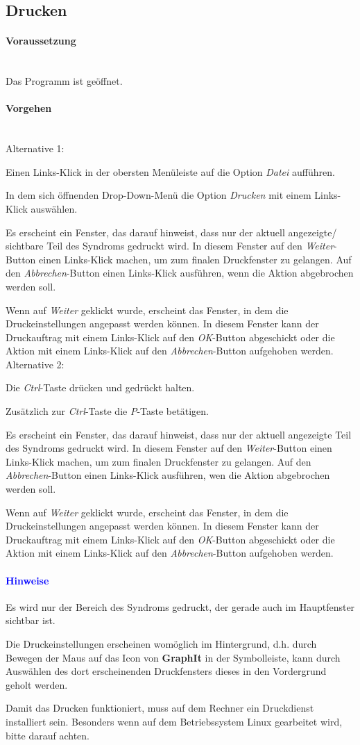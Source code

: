 \documentclass[enabledeprecatedfontcommands,fontsize=11pt,paper=a4,twoside]{scrartcl}
\newcounter{one}
\newcounter{two}[one]
\newcommand*{\hint}{\paragraph{\textcolor{blue}{Hinweise}}}
\newcommand*{\condition}{\paragraph{Voraussetzung}$\;$ \vspace{0.2cm}\\}
\newcommand*{\actions}{\paragraph{Vorgehen} $\;$\vspace{0.2cm}\\}
\newcommand*{\aOne}{\textcolor{bbe}{Alternative 1:}}
\newcommand*{\aTwo}{\textcolor{bbe}{Alternative 2:}}
\let\tempone\itemize
\let\temptwo\enditemize
\renewenvironment{itemize}{\tempone\addtolength{\itemsep}{-10.0pt}}{\temptwo}
\let\origenumerate\enumerate
\let\origendenumerate\endenumerate
\renewenvironment{enumerate}{\origenumerate \addtolength{\itemsep}{-10.0pt}}{\origendenumerate}
\begin{document}
\subsection{Drucken} \label{print}
	\condition 
	Das Programm ist geöffnet.
	\actions
	\aOne
	\begin{enumerate}
		\item Einen Links-Klick in der obersten Menüleiste auf die Option \textit{Datei} aufführen.
		\item In dem sich öffnenden Drop-Down-Menü die Option \textit{Drucken} mit einem Links-Klick auswählen.
		\item Es erscheint ein Fenster, das darauf hinweist, dass nur der aktuell angezeigte/ sichtbare Teil des Syndroms gedruckt wird. In diesem Fenster auf den \textit{Weiter}-Button einen Links-Klick machen, um zum finalen Druckfenster zu gelangen. Auf den \textit{Abbrechen}-Button einen Links-Klick ausführen, wenn die Aktion abgebrochen werden soll.
		\item Wenn auf \textit{Weiter} geklickt wurde, erscheint das Fenster, in dem die Druckeinstellungen angepasst werden können. In diesem Fenster kann der Druckauftrag mit einem Links-Klick auf den \textit{OK}-Button abgeschickt oder die Aktion mit einem Links-Klick auf den \textit{Abbrechen}-Button aufgehoben werden.
	\end{enumerate} 
	\aTwo
	\begin{enumerate}
		\item Die \textit{Ctrl}-Taste drücken und gedrückt halten.
		\item Zusätzlich zur \textit{Ctrl}-Taste die \textit{P}-Taste betätigen.
		\item Es erscheint ein Fenster, das darauf hinweist, dass nur der aktuell angezeigte Teil des Syndroms gedruckt wird. In diesem Fenster auf den \textit{Weiter}-Button einen Links-Klick machen, um zum finalen Druckfenster zu gelangen. Auf den \textit{Abbrechen}-Button einen Links-Klick ausführen, wen die Aktion abgebrochen werden soll.
		\item Wenn auf \textit{Weiter} geklickt wurde, erscheint das Fenster, in dem die Druckeinstellungen angepasst werden können. In diesem Fenster kann der Druckauftrag mit einem Links-Klick auf den \textit{OK}-Button abgeschickt oder die Aktion mit einem Links-Klick auf den \textit{Abbrechen}-Button aufgehoben werden.
	\end{enumerate} 
	\hint
	\begin{itemize}
		\item Es wird nur der Bereich des Syndroms gedruckt, der gerade auch im Hauptfenster sichtbar ist.
		\item Die Druckeinstellungen erscheinen womöglich im Hintergrund, d.h. durch Bewegen der Maus auf das Icon von \textbf{GraphIt} in der Symbolleiste, kann durch Auswählen des dort erscheinenden Druckfensters dieses in den Vordergrund geholt werden. 
		\item Damit das Drucken funktioniert, muss auf dem Rechner ein Druckdienst installiert sein. Besonders wenn auf dem Betriebssystem Linux gearbeitet wird, bitte darauf achten. \\
	\end{itemize}
\end{document}
